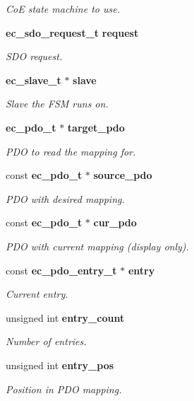 \begin{DoxyCompactItemize}
\begin{DoxyCompactList}\small\item\em \-Co\-E state machine to use. \end{DoxyCompactList}\item 
{\bf ec\-\_\-sdo\-\_\-request\-\_\-t} {\bf request}
\begin{DoxyCompactList}\small\item\em \-S\-D\-O request. \end{DoxyCompactList}\item 
{\bf ec\-\_\-slave\-\_\-t} $\ast$ {\bf slave}
\begin{DoxyCompactList}\small\item\em \-Slave the \-F\-S\-M runs on. \end{DoxyCompactList}\item 
{\bf ec\-\_\-pdo\-\_\-t} $\ast$ {\bf target\-\_\-pdo}
\begin{DoxyCompactList}\small\item\em \-P\-D\-O to read the mapping for. \end{DoxyCompactList}\item 
const {\bf ec\-\_\-pdo\-\_\-t} $\ast$ {\bf source\-\_\-pdo}
\begin{DoxyCompactList}\small\item\em \-P\-D\-O with desired mapping. \end{DoxyCompactList}\item 
const {\bf ec\-\_\-pdo\-\_\-t} $\ast$ {\bf cur\-\_\-pdo}
\begin{DoxyCompactList}\small\item\em \-P\-D\-O with current mapping (display only). \end{DoxyCompactList}\item 
const {\bf ec\-\_\-pdo\-\_\-entry\-\_\-t} $\ast$ {\bf entry}
\begin{DoxyCompactList}\small\item\em \-Current entry. \end{DoxyCompactList}\item 
unsigned int {\bf entry\-\_\-count}
\begin{DoxyCompactList}\small\item\em \-Number of entries. \end{DoxyCompactList}\item 
unsigned int {\bf entry\-\_\-pos}
\begin{DoxyCompactList}\small\item\em \-Position in \-P\-D\-O mapping. \end{DoxyCompactList}\end{DoxyCompactItemize}


